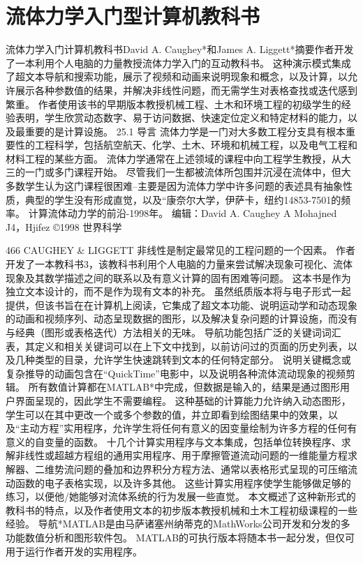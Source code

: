 \documentclass[UTF8,11pt,a4paper,openany,fontset=fandol]{ctexbook}
\begin{document}
\chapter{流体力学入门型计算机教科书}
流体力学入门计算机教科书David A. Caughey*和James A. Liggett*摘要作者开发了一本利用个人电脑的力量教授流体力学入门的互动教科书。 这种演示模式集成了超文本导航和搜索功能，展示了视频和动画来说明现象和概念，以及计算，以允许展示各种参数值的结果，并解决非线性问题，而无需学生对表格查找或迭代感到繁重。 作者使用该书的早期版本教授机械工程、土木和环境工程的初级学生的经验表明，学生欣赏动态数字、易于访问数据、快速定位定义和特定材料的能力，以及最重要的是计算设施。 25.1 导言 流体力学是一门对大多数工程分支具有根本重要性的工程科学，包括航空航天、化学、土木、环境和机械工程，以及电气工程和材料工程的某些方面。 流体力学通常在上述领域的课程中向工程学生教授，从大三的一门或多门课程开始。 尽管我们一生都被流体所包围并沉浸在流体中，但大多数学生认为这门课程很困难--主要是因为流体力学中许多问题的表述具有抽象性质，典型的学生没有形成直觉，以及“康奈尔大学，伊萨卡，纽约14853-7501的频率。 计算流体动力学的前沿-1998年。 编辑：David A. Caughey A Mohajned J4，Hjifez ©1998 世界科学

466 CAUGHEY \& LIGGETT 非线性是制定最常见的工程问题的一个因素。 作者开发了一本教科书3，该教科书利用个人电脑的力量来尝试解决现象可视化、流体现象及其数学描述之间的联系以及有意义计算的固有困难等问题。 这本书是作为独立文本设计的，而不是作为现有文本的补充。 虽然纸质版本将与电子形式一起提供，但该书旨在在计算机上阅读，它集成了超文本功能、说明运动学和动态现象的动画和视频序列、动态呈现数据的图形，以及解决复杂问题的计算设施，而没有与经典（图形或表格迭代）方法相关的无味。 导航功能包括广泛的关键词词汇表，其定义和相关关键词可以在上下文中找到，以前访问过的页面的历史列表，以及几种类型的目录，允许学生快速跳转到文本的任何特定部分。 说明关键概念或复杂推导的动画包含在“QuickTime”电影中，以及说明各种流体流动现象的视频剪辑。 所有数值计算都在MATLAB*中完成，但数据是输入的，结果是通过图形用户界面呈现的，因此学生不需要编程。 这种基础的计算能力允许纳入动态图形，学生可以在其中更改一个或多个参数的值，并立即看到绘图结果中的效果，以及“主动方程”实用程序，允许学生将任何有意义的因变量绘制为许多方程的任何有意义的自变量的函数。 十几个计算实用程序与文本集成，包括单位转换程序、求解非线性或超越方程组的通用实用程序、用于摩擦管道流动问题的一维能量方程求解器、二维势流问题的叠加和边界积分方程方法、通常以表格形式呈现的可压缩流动函数的电子表格实现，以及许多其他。 这些计算实用程序使学生能够做足够的练习，以便他/她能够对流体系统的行为发展一些直觉。 本文概述了这种新形式的教科书的特点，以及作者使用文本的初步版本教授机械和土木工程初级课程的一些经验。 导航*MATLAB是由马萨诸塞州纳蒂克的MathWorks公司开发和分发的多功能数值分析和图形软件包。 MATLAB的可执行版本将随本书一起分发，但仅可用于运行作者开发的实用程序。
\end{document}
